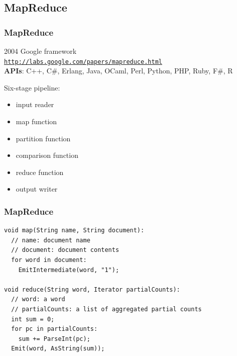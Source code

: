 \documentclass{beamer}
\begin{document}
\subsection{MapReduce}
\begin{frame}
\frametitle{MapReduce}
2004 Google framework\\
\texttt{\url{http://labs.google.com/papers/mapreduce.html}}\\
\textbf{APIs}: C++, C\#, Erlang, Java, OCaml, Perl, Python, PHP, Ruby, F\#, R

\pause \bigskip

Six-stage pipeline:
\begin{itemize}
  \item input reader
  \item map function
  \item partition function
  \item comparison function
  \item reduce function
  \item output writer
\end{itemize}
\end{frame}

\begin{frame}[fragile]
\frametitle{MapReduce}
\begin{verbatim}
void map(String name, String document):
  // name: document name
  // document: document contents
  for word in document:
    EmitIntermediate(word, "1");
 
void reduce(String word, Iterator partialCounts):
  // word: a word
  // partialCounts: a list of aggregated partial counts
  int sum = 0;
  for pc in partialCounts:
    sum += ParseInt(pc);
  Emit(word, AsString(sum));
\end{verbatim}
\end{frame}

\end{document}
